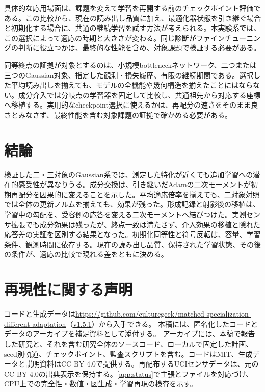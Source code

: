 具体的な応用場面は、課題を変えて学習を再開する前のチェックポイント評価である。この比較から、現在の読み出し品質に加え、最適化器状態を引き継ぐ場合と初期化する場合に、共通の継続学習を試す方法が考えられる。本実験系では、この選択によって適応の時期と大きさが変わる。同じ診断がファインチューニングの判断に役立つかは、最終的な性能を含め、対象課題で検証する必要がある。

同等終点の証拠が対象とするのは、小規模bottleneckネットワーク、二つまたは三つのGaussian対象、指定した観測・損失履歴、有限の継続期間である。選択した平均読み出しを揃えても、モデルの全機能や幾何構造を揃えたことにはならない。成分介入では分岐点の学習器を固定して比較し、共通祖先から対応する座標へ移植する。実用的なcheckpoint選択に使えるかは、再配分の速さをそのまま良さとみなさず、最終性能を含む対象課題の証拠で確かめる必要がある。

\section{結論}
検証した二・三対象のGaussian系では、測定した特化が近くても追加学習への潜在的感受性が異なりうる。成分交換は、引き継いだAdamの二次モーメントが初期再配分を因果的に変えることを示した。平均適応倍率を揃えても、二対象対照では全体の更新ノルムを揃えても、効果が残った。形成記録と射影後の移植は、学習中の勾配を、受容側の応答を変える二次モーメントへ結びつけた。実測センサ拡張でも成分効果は残ったが、終点一致は満たさず、介入効果の移植と隠れた応答差の実証を区別する結果となった。初期化同等性と符号反転は、容量、学習条件、観測時間に依存する。現在の読み出し品質、保持された学習状態、その後の条件が、適応の比較で現れる差をともに決める。

\section*{再現性に関する声明}
\ifpublicrelease
コードと生成データは\url{https://github.com/culturegeek/matched-specialization-different-adaptation}（\href{https://github.com/culturegeek/matched-specialization-different-adaptation/releases/tag/v1.5.1}{v1.5.1}）から入手できる。
\else
本稿には、匿名化したコードとデータのアーカイブを補足資料として添付する。
\fi
アーカイブには、本稿で報告した研究と、それを含む研究全体のソースコード、ローカルで固定した計画、seed別軌道、チェックポイント、監査スクリプトを含む。コードはMIT、生成データと説明資料はCC BY 4.0で提供する。再配布するUCIセンサデータは、元のCC BY 4.0の出典表示を保持する。\ref{app:status}で主張とファイルを対応づけ、CPU上での完全性・数値・図生成・学習再現の検査を示す。

